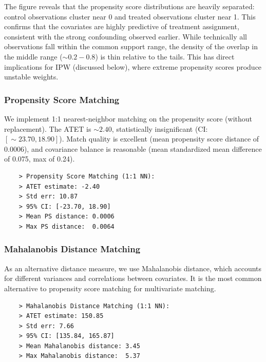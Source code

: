 \documentclass[10pt]{article}
\begin{document}
The figure reveals that the propensity score distributions are heavily separated: control observations cluster near 0 and treated observations cluster near 1. This confirms that the covariates are highly predictive of treatment assignment, consistent with the strong confounding observed earlier. While technically all observations fall within the common support range, the density of the overlap in the middle range ($\sim 0.2 - 0.8 $) is thin relative to the tails. This has direct implications for IPW (discussed below), where extreme propensity scores produce unstable weights. 

\subsubsection{Propensity Score Matching} 

We implement 1:1 nearest-neighbor matching on the propensity score (without replacement). The ATET is $\sim 2.40 $, statistically insignificant (CI: $[\sim 23.70, 18.90] $). Match quality is excellent (mean propensity score distance of 0.0006), and covariance balance is reasonable (mean standardized mean difference of 0.075, max of 0.24). 
\begin{verbatim}
    > Propensity Score Matching (1:1 NN):
    > ATET estimate: -2.40
    > Std err: 10.87
    > 95% CI: [-23.70, 18.90]
    > Mean PS distance: 0.0006
    > Max PS distance:  0.0064
\end{verbatim}


\newpage 
\subsubsection{Mahalanobis Distance Matching}

As an alternative distance measure, we use Mahalanobis distance, which accounts for different variances and correlations between covariates. It is the most common alternative to propensity score matching for multivariate matching. 

\begin{verbatim}
    > Mahalanobis Distance Matching (1:1 NN):
    > ATET estimate: 150.85
    > Std err: 7.66
    > 95% CI: [135.84, 165.87]
    > Mean Mahalanobis distance: 3.45
    > Max Mahalanobis distance:  5.37
\end{verbatim}
\end{document}
